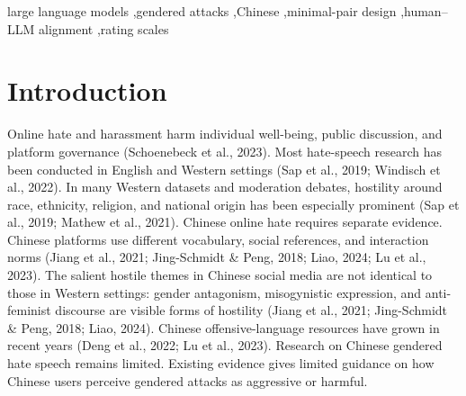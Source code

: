 \documentclass[a4paper,fleqn,review]{cas-sc}
\begin{document}
\begin{keywords}
large language models \sep gendered attacks \sep Chinese \sep minimal-pair design \sep human--LLM alignment \sep rating scales
\end{keywords}

\maketitle
\linenumbers

\section{Introduction}
\label{sec:intro}

Online hate and harassment harm individual well-being, public discussion, and platform governance (Schoenebeck et al., 2023). Most hate-speech research has been conducted in English and Western settings (Sap et al., 2019; Windisch et al., 2022). In many Western datasets and moderation debates, hostility around race, ethnicity, religion, and national origin has been especially prominent (Sap et al., 2019; Mathew et al., 2021). Chinese online hate requires separate evidence. Chinese platforms use different vocabulary, social references, and interaction norms (Jiang et al., 2021; Jing-Schmidt \& Peng, 2018; Liao, 2024; Lu et al., 2023). The salient hostile themes in Chinese social media are not identical to those in Western settings: gender antagonism, misogynistic expression, and anti-feminist discourse are visible forms of hostility (Jiang et al., 2021; Jing-Schmidt \& Peng, 2018; Liao, 2024). Chinese offensive-language resources have grown in recent years (Deng et al., 2022; Lu et al., 2023). Research on Chinese gendered hate speech remains limited. Existing evidence gives limited guidance on how Chinese users perceive gendered attacks as aggressive or harmful.
\end{document}
